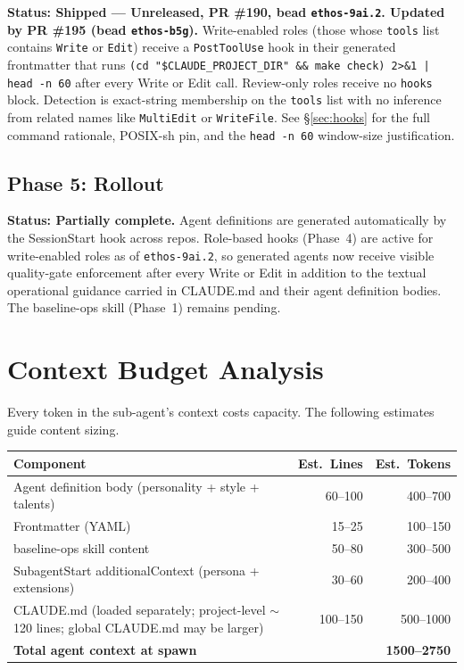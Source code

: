 \documentclass[a4paper,10pt]{article}
\newcommand{\field}[1]{\texttt{#1}}
\newcommand{\cmd}[1]{\texttt{#1}}
\begin{document}
\textbf{Status: Shipped --- Unreleased, PR \#190, bead
\cmd{ethos-9ai.2}. Updated by PR \#195 (bead \cmd{ethos-b5g}).}
Write-enabled roles (those whose \field{tools} list contains
\cmd{Write} or \cmd{Edit}) receive a \field{PostToolUse} hook in
their generated frontmatter that runs
\cmd{(cd "\$CLAUDE\_PROJECT\_DIR" \&\& make check) 2>\&1 | head -n 60}
after every Write or Edit call. Review-only roles receive no
\field{hooks} block. Detection is exact-string membership on the
\field{tools} list with no inference from related names like
\cmd{MultiEdit} or \cmd{WriteFile}. See \S\ref{sec:hooks} for the
full command rationale, POSIX-sh pin, and the \cmd{head -n 60}
window-size justification.

\subsection{Phase 5: Rollout}
\label{sec:phase5}

\textbf{Status: Partially complete.} Agent definitions are generated
automatically by the SessionStart hook across repos. Role-based
hooks (Phase~4) are active for write-enabled roles as of
\cmd{ethos-9ai.2}, so generated agents now receive visible
quality-gate enforcement after every Write or Edit in addition to
the textual operational guidance carried in CLAUDE.md and their
agent definition bodies. The baseline-ops skill (Phase~1) remains
pending.

\section{Context Budget Analysis}
\label{sec:budget}

Every token in the sub-agent's context costs capacity. The following
estimates guide content sizing.

\begin{center}
\begin{tabularx}{\textwidth}{@{}Xrr@{}}
\toprule
\textbf{Component} & \textbf{Est.\ Lines} & \textbf{Est.\ Tokens} \\
\midrule
Agent definition body (personality + style + talents) & 60--100 &
  400--700 \\
Frontmatter (YAML) & 15--25 & 100--150 \\
baseline-ops skill content & 50--80 & 300--500 \\
SubagentStart additionalContext (persona + extensions) & 30--60 &
  200--400 \\
CLAUDE.md (loaded separately; project-level $\sim$120 lines;
  global CLAUDE.md may be larger) & 100--150 & 500--1000 \\
\midrule
\textbf{Total agent context at spawn} & & \textbf{1500--2750} \\
\bottomrule
\end{tabularx}
\end{center}
\end{document}
